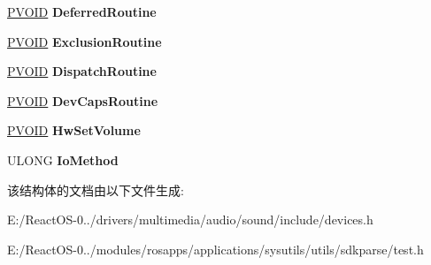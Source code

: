 \begin{DoxyCompactItemize}
\mbox{\label{struct_s_o_u_n_d___d_e_v_i_c_e___i_n_i_t_a34c70ca8d9c646c0f72e0a83cce40cf9}} 
\hyperlink{interfacevoid}{P\+V\+O\+ID} {\bfseries Deferred\+Routine}
\item 
\mbox{\label{struct_s_o_u_n_d___d_e_v_i_c_e___i_n_i_t_a96f7fc1192e887f1a17af9909849b4b5}} 
\hyperlink{interfacevoid}{P\+V\+O\+ID} {\bfseries Exclusion\+Routine}
\item 
\mbox{\label{struct_s_o_u_n_d___d_e_v_i_c_e___i_n_i_t_a07eff0d9253b542c5143739f0805657f}} 
\hyperlink{interfacevoid}{P\+V\+O\+ID} {\bfseries Dispatch\+Routine}
\item 
\mbox{\label{struct_s_o_u_n_d___d_e_v_i_c_e___i_n_i_t_ada5f12e2ef5c68b2f45bbd9bbf1bf374}} 
\hyperlink{interfacevoid}{P\+V\+O\+ID} {\bfseries Dev\+Caps\+Routine}
\item 
\mbox{\label{struct_s_o_u_n_d___d_e_v_i_c_e___i_n_i_t_ab9f671e0ae8b54b433aee4eae09de3b7}} 
\hyperlink{interfacevoid}{P\+V\+O\+ID} {\bfseries Hw\+Set\+Volume}
\item 
\mbox{\label{struct_s_o_u_n_d___d_e_v_i_c_e___i_n_i_t_af2d53119111cbf18341fb867bc7f67c6}} 
U\+L\+O\+NG {\bfseries Io\+Method}
\end{DoxyCompactItemize}


该结构体的文档由以下文件生成\+:\begin{DoxyCompactItemize}
\item 
E\+:/\+React\+O\+S-\/0../drivers/multimedia/audio/sound/include/devices.\+h\item 
E\+:/\+React\+O\+S-\/0../modules/rosapps/applications/sysutils/utils/sdkparse/test.\+h\end{DoxyCompactItemize}
